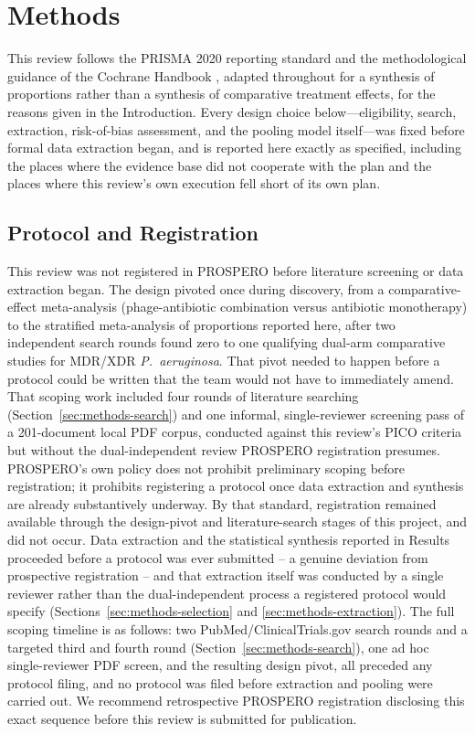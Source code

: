 \section{Methods}
\label{sec:methods}

This review follows the PRISMA 2020 reporting standard \parencite{Page2021_prisma} and the methodological guidance of the Cochrane Handbook \parencite{Higgins2023_cochranehandbook}, adapted throughout for a synthesis of proportions rather than a synthesis of comparative treatment effects, for the reasons given in the Introduction. Every design choice below---eligibility, search, extraction, risk-of-bias assessment, and the pooling model itself---was fixed before formal data extraction began, and is reported here exactly as specified, including the places where the evidence base did not cooperate with the plan and the places where this review's own execution fell short of its own plan.

\subsection{Protocol and Registration}
\label{sec:methods-protocol}

This review was not registered in PROSPERO before literature screening or data extraction began. The design pivoted once during discovery, from a comparative-effect meta-analysis (phage-antibiotic combination versus antibiotic monotherapy) to the stratified meta-analysis of proportions reported here, after two independent search rounds found zero to one qualifying dual-arm comparative studies for MDR/XDR \textit{P.\ aeruginosa}. That pivot needed to happen before a protocol could be written that the team would not have to immediately amend. That scoping work included four rounds of literature searching (Section~\ref{sec:methods-search}) and one informal, single-reviewer screening pass of a 201-document local PDF corpus, conducted against this review's PICO criteria but without the dual-independent review PROSPERO registration presumes. PROSPERO's own policy does not prohibit preliminary scoping before registration; it prohibits registering a protocol once data extraction and synthesis are already substantively underway. By that standard, registration remained available through the design-pivot and literature-search stages of this project, and did not occur. Data extraction and the statistical synthesis reported in Results proceeded before a protocol was ever submitted -- a genuine deviation from prospective registration -- and that extraction itself was conducted by a single reviewer rather than the dual-independent process a registered protocol would specify (Sections~\ref{sec:methods-selection} and \ref{sec:methods-extraction}). The full scoping timeline is as follows: two PubMed/ClinicalTrials.gov search rounds and a targeted third and fourth round (Section~\ref{sec:methods-search}), one ad hoc single-reviewer PDF screen, and the resulting design pivot, all preceded any protocol filing, and no protocol was filed before extraction and pooling were carried out. We recommend retrospective PROSPERO registration disclosing this exact sequence before this review is submitted for publication.

